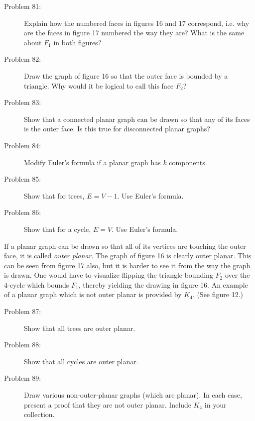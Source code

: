\documentclass{article}
\begin{document}
\begin{description}

\item[Problem 81:] Explain how the numbered faces in figures 16 and 17 correspond, i.e. why are the faces in figure 17 numbered the way they are? What is the same about $F_1$ in both figures?

\item[Problem 82:] Draw the graph of figure 16 so that the outer face is bounded by a triangle. Why would it be logical to call this face $F_2$?

\item[Problem 83:] Show that a connected planar graph can be drawn so that any of its faces is the outer face. Is this true for disconnected planar graphs?

\item[Problem 84:] Modify Euler's formula if a planar graph has $k$ components.

\item[Problem 85:] Show that for trees, $E=V-1$. Use Euler's formula.

\item[Problem 86:] Show that for a cycle, $E=V$. Use Euler's formula.

\end{description}

If a planar graph can be drawn so that all of its vertices are touching the outer face, it is called \emph{outer planar}. The graph of figure 16 is clearly outer planar. This can be seen from figure 17 also, but it is harder to see it from the way the graph is drawn. One would have to visualize flipping the triangle bounding $F_2$ over the $4$-cycle which bounds $F_1$, thereby yielding the drawing in figure 16. An example of a planar graph which is not outer planar is provided by $K_4$. (See figure 12.)

\begin{description}

\item[Problem 87:] Show that all trees are outer planar.

\item[Problem 88:] Show that all cycles are outer planar.

\item[Problem 89:] Draw various non-outer-planar graphs (which are planar). In each case, present a proof that they are not outer planar. Include $K_4$ in your collection.

\end{description}
\end{document}
